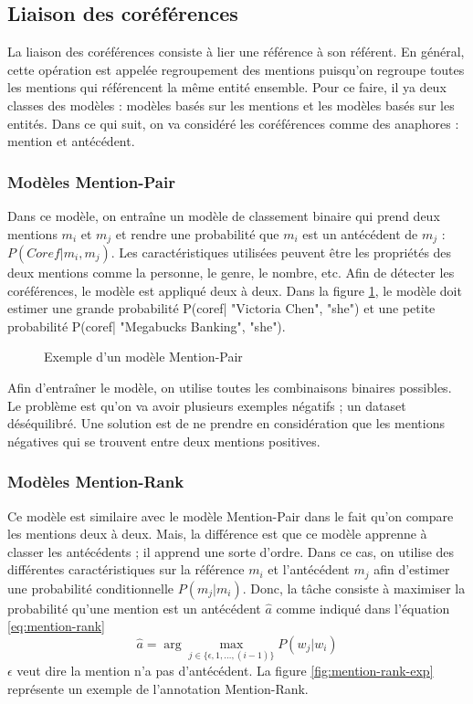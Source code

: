 \documentclass{KodeBook}
\begin{document}
\subsection{Liaison des coréférences}

La liaison des coréférences consiste à lier une référence à son référent. 
En général, cette opération est appelée regroupement des mentions puisqu'on regroupe toutes les mentions qui référencent la même entité ensemble. 
Pour ce faire, il ya deux classes des modèles : modèles basés sur les mentions et les modèles basés sur les entités. 
Dans ce qui suit, on va considéré les coréférences comme des anaphores : mention et antécédent.

\subsubsection{Modèles Mention-Pair}

Dans ce modèle, on entraîne un modèle de classement binaire qui prend deux mentions $m_i$ et $m_j$ et rendre une probabilité que $m_i$ est un antécédent de $m_j$ : $P(Coref|m_i, m_j)$. 
Les caractéristiques utilisées peuvent être les propriétés des deux mentions comme la personne, le genre, le nombre, etc.
Afin de détecter les coréférences, le modèle est appliqué deux à deux.
Dans la figure \ref{fig:mention-pair-exp}, le modèle doit estimer une grande probabilité P(coref| "Victoria Chen", "she") et une petite probabilité P(coref| "Megabucks Banking", "she").

\begin{figure}[ht]
	\centering
	\caption{Exemple d'un modèle Mention-Pair \cite{2019-jurafsky-martin}}
	\label{fig:mention-pair-exp}
\end{figure}

Afin d'entraîner le modèle, on utilise toutes les combinaisons binaires possibles.
Le problème est qu'on va avoir plusieurs exemples négatifs ; un dataset déséquilibré. 
Une solution est de ne prendre en considération que les mentions négatives qui se trouvent entre deux mentions positives.

\subsubsection{Modèles Mention-Rank}

Ce modèle est similaire avec le modèle Mention-Pair dans le fait qu'on compare les mentions deux à deux. 
Mais, la différence est que ce modèle apprenne à classer les antécédents ; il apprend une sorte d'ordre. 
Dans ce cas, on utilise des différentes caractéristiques sur la référence $m_i$ et l'antécédent $m_j$ afin d'estimer une probabilité conditionnelle $P(m_j|m_i)$.
Donc, la tâche consiste à maximiser la probabilité qu'une mention est un antécédent $\hat{a}$ comme indiqué dans l'équation \ref{eq:mention-rank}
\begin{equation}\label{eq:mention-rank}
\hat{a} = \arg\max_{j \in \{\epsilon, 1, \ldots, (i-1)\}} P(w_j|w_i) 
\end{equation}
$\epsilon$ veut dire la mention n'a pas d'antécédent. 
La figure \ref{fig:mention-rank-exp} représente un exemple de l'annotation Mention-Rank.
\end{document}
